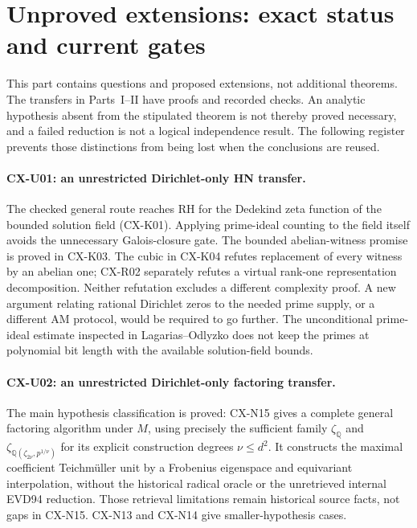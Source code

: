 \section{Unproved extensions: exact status and current gates}
\label{sec:unproved}

This part contains questions and proposed extensions, not additional
theorems. The transfers in Parts~I--II have proofs and recorded checks.
An analytic hypothesis absent from the stipulated theorem is not thereby
proved necessary, and a failed reduction is not a logical independence
result. The following register prevents those distinctions from being
lost when the conclusions are reused.

\paragraph{CX-U01: an unrestricted Dirichlet-only HN transfer.}
The checked general route reaches RH for the Dedekind zeta function of
the bounded solution field (CX-K01). Applying prime-ideal counting to
the field itself avoids the unnecessary Galois-closure gate.
The bounded abelian-witness promise is proved in CX-K03.
The cubic in CX-K04 refutes replacement of every witness by an abelian
one; CX-R02 separately refutes a virtual rank-one representation
decomposition. Neither refutation excludes a different complexity
proof. A new argument relating rational Dirichlet zeros to the needed
prime supply, or a different AM protocol, would be required to go
further. The unconditional prime-ideal estimate inspected in
Lagarias--Odlyzko does not keep the primes at polynomial bit length
with the available solution-field bounds.

\paragraph{CX-U02: an unrestricted Dirichlet-only factoring transfer.}
The main hypothesis classification is proved: CX-N15 gives a complete
general factoring algorithm under $M$, using precisely the sufficient
family $\zeta_{\mathbb Q}$ and
$\zeta_{\mathbb Q(\zeta_{2\nu},p^{1/\nu})}$ for its explicit construction
degrees $\nu\le d^2$. It constructs the maximal coefficient Teichmüller
unit by a Frobenius eigenspace and equivariant interpolation, without
the historical radical oracle or the unretrieved internal EVD94 reduction.
Those retrieval limitations remain historical source facts, not gaps in
CX-N15. CX-N13 and CX-N14 give smaller-hypothesis cases.

